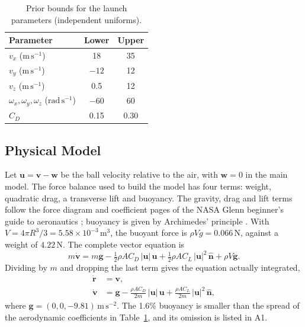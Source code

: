 \documentclass[11pt,a4paper]{article}
\begin{document}
\begin{table}[htbp]
  \centering
  \caption{Prior bounds for the launch parameters (independent uniforms).}
  \label{tab:prior}
  \begin{tabular}{lcc}
    \toprule
    Parameter & Lower & Upper \\
    \midrule
    $v_x$ ($\mathrm{m\,s^{-1}}$) & 18 & 35 \\
    $v_y$ ($\mathrm{m\,s^{-1}}$) & $-12$ & 12 \\
    $v_z$ ($\mathrm{m\,s^{-1}}$) & 0.5 & 12 \\
    $\omega_x,\omega_y,\omega_z$ ($\mathrm{rad\,s^{-1}}$) & $-60$ & 60 \\
    $C_D$ & 0.15 & 0.30 \\
    \bottomrule
  \end{tabular}
\end{table}

\subsection{Physical Model}
\label{sec:forces}

Let $\mathbf{u}=\mathbf{v}-\mathbf{w}$ be the ball velocity relative to the air, with $\mathbf{w}=0$ in the main model. The force balance used to build the model has four terms: weight, quadratic drag, a transverse lift and buoyancy. The gravity, drag and lift terms follow the force diagram and coefficient pages of the NASA Glenn beginner's guide to aeronautics \cite{nasaforces,nasadrag,nasalift}; buoyancy is given by Archimedes' principle \cite{archimedes}. With $V=4\pi R^3/3=5.58\times10^{-3}\,\mathrm{m^3}$, the buoyant force is $\rho V g=0.066\,\mathrm{N}$, against a weight of $4.22\,\mathrm{N}$. The complete vector equation is
\begin{equation}
  m\dot{\mathbf{v}}
  = m\mathbf{g}
  - \tfrac12\rho A C_D\,|\mathbf{u}|\,\mathbf{u}
  + \tfrac12\rho A C_L\,|\mathbf{u}|^2\,\hat{\mathbf{n}}
  + \rho V\mathbf{g}.
  \label{eq:full}
\end{equation}
Dividing by $m$ and dropping the last term gives the equation actually integrated,
\begin{align}
  \dot{\mathbf{r}} &= \mathbf{v}, \label{eq:kin}\\
  \dot{\mathbf{v}} &= \mathbf{g}
    - \frac{\rho A C_D}{2m}\,|\mathbf{u}|\,\mathbf{u}
    + \frac{\rho A C_L}{2m}\,|\mathbf{u}|^2\,\hat{\mathbf{n}}, \label{eq:dyn}
\end{align}
where $\mathbf{g}=(0,0,-9.81)\,\mathrm{m\,s^{-2}}$. The 1.6\% buoyancy is smaller than the spread of the aerodynamic coefficients in Table~\ref{tab:prior}, and its omission is listed in A1.
\end{document}
